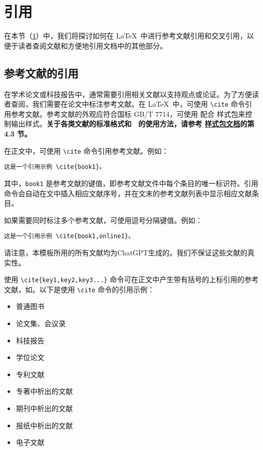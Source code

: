 \section{引用}\label{sec:reference}

在本节（\cref{sec:reference}）中，我们将探讨如何在 \LaTeX\ 中进行参考文献引用和交叉引用，以便于读者查阅文献和方便地引用文档中的其他部分。

\subsection{参考文献的引用}

在学术论文或科技报告中，通常需要引用相关文献以支持观点或论证。为了方便读者查阅，我们需要在论文中标注参考文献。在 \LaTeX\ 中，可使用 \verb|\cite| 命令引用参考文献。参考文献的外观应符合国标 GB/T 7714，可使用 \BibLaTeX{} 配合  样式包来控制输出样式。\textbf{关于各类文献的标准格式和 \BibLaTeX\ 的使用方法，请参考 \href{https://ctan.org/pkg/biblatex-gb7714-2015}{ 样式包文档}的第 4.3 节。}

在正文中，可使用 \verb|\cite| 命令引用参考文献。例如：

\begin{Verbatim}
这是一个引用示例 \cite{book1}。
\end{Verbatim}

其中，\verb|book1| 是参考文献的键值，即参考文献文件中每个条目的唯一标识符。引用命令会自动在文中插入相应文献序号，并在文末的参考文献列表中显示相应文献条目。

如果需要同时标注多个参考文献，可使用逗号分隔键值。例如：

\begin{Verbatim}
这是一个引用示例 \cite{book1,online1}。
\end{Verbatim}

请注意，本模板所用的所有文献均为ChatGPT生成的。我们不保证这些文献的真实性。

使用 \verb|\cite{key1,key2,key3...}| 命令可在正文中产生带有括号的上标引用的参考文献，如\cite{book1,online1,article1}。以下是使用 \verb|\cite| 命令的引用示例：
\begin{itemize}
  \item 普通图书\cite{book1,book2}
  \item 论文集、会议录\cite{conf1,conf2}
  \item 科技报告\cite{techreport1,techreport2}
  \item 学位论文\cite{thesis1,thesis2,thesis3}
  \item 专利文献\cite{patent1,patent2}
  \item 专著中析出的文献\cite{inbook1,inbook2}
  \item 期刊中析出的文献\cite{qin2021,article1,article2}
  \item 报纸中析出的文献\cite{newspaper1,newspaper2}
  \item 电子文献\cite{online1,online2,online3}
\end{itemize}

